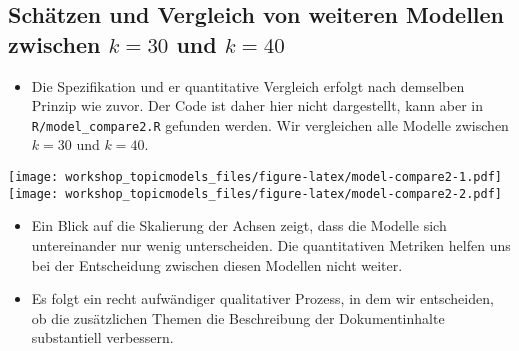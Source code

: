 \documentclass[
]{book}
\providecommand{\tightlist}{%
  \setlength{\itemsep}{0pt}\setlength{\parskip}{0pt}}
\begin{document}
\hypertarget{schuxe4tzen-und-vergleich-von-weiteren-modellen-zwischen-k-30-und-k-40}{%
\subsection{\texorpdfstring{Schätzen und Vergleich von weiteren Modellen zwischen \(k = 30\) und \(k = 40\)}{Schätzen und Vergleich von weiteren Modellen zwischen k = 30 und k = 40}}\label{schuxe4tzen-und-vergleich-von-weiteren-modellen-zwischen-k-30-und-k-40}}

\begin{itemize}
\tightlist
\item
  Die Spezifikation und er quantitative Vergleich erfolgt nach demselben Prinzip wie zuvor. Der Code ist daher hier nicht dargestellt, kann aber in \texttt{R/model\_compare2.R} gefunden werden. Wir vergleichen alle Modelle zwischen \(k = 30\) und \(k = 40\).
\end{itemize}

\texttt{[image: workshop\_topicmodels\_files/figure-latex/model-compare2-1.pdf]} \texttt{[image: workshop\_topicmodels\_files/figure-latex/model-compare2-2.pdf]}

\begin{itemize}
\tightlist
\item
  Ein Blick auf die Skalierung der Achsen zeigt, dass die Modelle sich untereinander nur wenig unterscheiden. Die quantitativen Metriken helfen uns bei der Entscheidung zwischen diesen Modellen nicht weiter.
\item
  Es folgt ein recht aufwändiger qualitativer Prozess, in dem wir entscheiden, ob die zusätzlichen Themen die Beschreibung der Dokumentinhalte substantiell verbessern.
\end{itemize}

  
\end{document}
